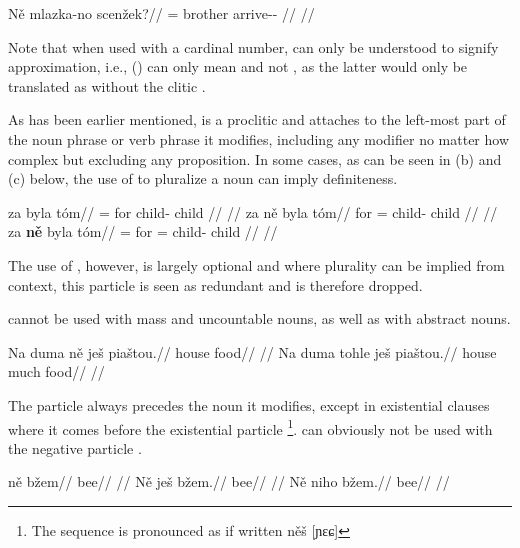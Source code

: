 \pex
\begingl
    \gla Ně mlazka-no scenžek?//
    \glb \Hon{}= brother arrive-\Av{}-\Pf{} //
    \glft {}//
\endgl
\xe

Note that when used with a cardinal number,  can only be understood to signify approximation, i.e., () can only mean  and not , as the latter would only be translated as  without the clitic .

As has been earlier mentioned,  is a proclitic and attaches to the left-most part of the noun phrase or verb phrase it modifies, including any modifier no matter how complex but excluding any proposition. In some cases, as can be seen in (b) and (c) below, the use of  to pluralize a noun can imply definiteness.

\pex
\a
\begingl{}
     za byla tóm//
    \glb \Pl{}= for child-\Acc{} child //
    \glft {}//
\endgl
\a
\begingl{}
    \gla za {ně} byla tóm//
    \glb for \Pl{}= child-\Acc{} child //
    \glft {}//
\endgl
\a
\begingl{}
     za \textbf{ně} byla tóm//
    \glb \Pl{}= for \Pl{}= child-\Acc{} child //
    \glft {}//
\endgl
\xe

The use of , however, is largely optional and where plurality can be implied from context, this particle is seen as redundant and is therefore dropped.

 cannot be used with mass and uncountable nouns, as well as with abstract nouns.

\pex
\a
\begingl
\gla *Na duma ně ješ piaštou.//
\glb \Loc{} house \Pl{} \Exst{} food//
\glft {}//
\endgl
\a
\begingl
\gla Na duma tohle ješ piaštou.//
\glb \Loc{} house much \Exst{} food//
\glft {}//
\endgl
\xe

The particle  always precedes the noun it modifies, except in
existential clauses where it comes before the existential particle
\footnote{The sequence is pronounced as if written něš [ɲɛɕ]}.
 can obviously not be used with the negative particle
.

\pex
\a
\begingl
\gla ně bžem//
\glb \Pl{} bee//
\glft {}//
\endgl
\a
\begingl
\gla Ně ješ bžem.//
\glb \Pl{} \Exst{} bee//
\glft {}//
\endgl
\a
\begingl
\gla *Ně niho bžem.//
\glb \Pl{} \N{}\Exst{} bee//
\glft {}//
\endgl
\xe

